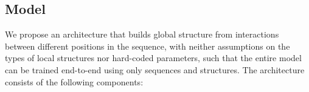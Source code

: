 \documentclass{article}
\begin{document}





\subsection{Model}


We propose an architecture that builds global structure from interactions between different positions in the sequence,
with neither assumptions on the types of local structures nor hard-coded parameters,
such that the entire model can be trained end-to-end using only sequences and structures.
The architecture consists of the following components:






%

\end{document}
